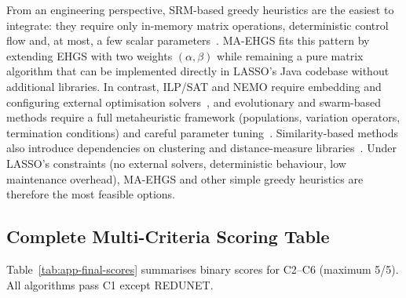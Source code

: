 \begin{appendices}
From an engineering perspective, SRM-based greedy heuristics are the easiest to integrate: they require only in-memory matrix operations, deterministic control flow and, at most, a few scalar parameters~\cite{harrold1993,gladston2015,yoo2012}. MA-EHGS fits this pattern by extending EHGS with two weights $(\alpha,\beta)$ while remaining a pure matrix algorithm that can be implemented directly in LASSO’s Java codebase without additional libraries. In contrast, ILP/SAT and NEMO require embedding and configuring external optimisation solvers~\cite{elbaum2002,lin2018}, and evolutionary and swarm-based methods require a full metaheuristic framework (populations, variation operators, termination conditions) and careful parameter tuning~\cite{yoo2012,khan2020,wei2017}. Similarity-based methods also introduce dependencies on clustering and distance-measure libraries~\cite{bach2017,khan2020}. Under LASSO’s constraints (no external solvers, deterministic behaviour, low maintenance overhead), MA-EHGS and other simple greedy heuristics are therefore the most feasible options.

\subsection{Complete Multi-Criteria Scoring Table}\label{app:final-scores}

Table~\ref{tab:app-final-scores} summarises binary scores for C2--C6 (maximum 5/5). All algorithms pass C1 except REDUNET.


\end{appendices}
